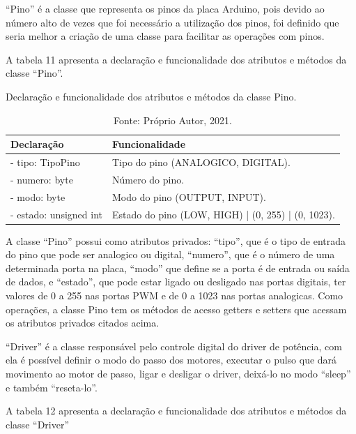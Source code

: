 “Pino” é a classe que representa os pinos da placa Arduino, pois devido ao número alto de vezes que foi 
necessário a utilização dos pinos, foi definido que seria melhor a criação de uma classe para facilitar 
as operações com pinos. 

A tabela 11 apresenta a declaração e funcionalidade dos atributos e métodos da classe “Pino”.

\begin{table}
    \centering
    \caption{Declaração e funcionalidade dos atributos e métodos da classe Pino.}
    \begin{tabular}{lp{9cm}}
        \hline
        \textbf{Declaração} & \textbf{Funcionalidade}\\
        \hline
        - tipo: TipoPino & Tipo do pino (ANALOGICO, DIGITAL).\\
        - numero: byte & Número do pino.\\
        - modo: byte & Modo do pino (OUTPUT, INPUT).\\
        - estado: unsigned int & Estado do pino (LOW, HIGH) | (0, 255) | (0, 1023).\\
        \hline       
    \end{tabular}
    \caption*{Fonte: Próprio Autor, 2021.}
    \label{tab:classepino}
\end{table}

A classe “Pino” possui como atributos privados: “tipo”, que é o tipo de entrada do pino que pode ser 
analogico ou digital, “numero”, que é o número de uma determinada porta na placa, “modo” que define se 
a porta é de entrada ou saída de dados, e “estado”, que pode estar ligado ou desligado nas portas digitais, 
ter valores de 0 a 255 nas portas PWM e de 0 a 1023 nas portas analogicas. Como operações, a classe Pino 
tem os métodos de acesso getters e setters que acessam os atributos privados citados acima.

“Driver” é a classe responsável pelo controle digital do driver de potência, com ela é possível definir 
o modo do passo dos motores, executar o pulso que dará movimento ao motor de passo, ligar e desligar 
o driver, deixá-lo no modo “sleep” e também “reseta-lo”.

A tabela 12 apresenta a declaração e funcionalidade dos atributos e métodos da classe “Driver”

